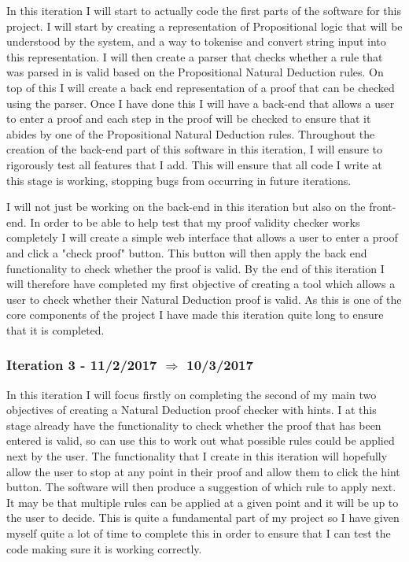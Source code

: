 In this iteration I will start to actually code the first parts of the software for this project. I will start by creating a representation of Propositional logic that will be understood by the system, and a way to tokenise and convert string input into this representation. I will then create a parser that checks whether a rule that was parsed in is valid based on the Propositional Natural Deduction rules. On top of this I will create a back end representation of a proof that can be checked using the parser. Once I have done this I will have a back-end that allows a user to enter a proof and each step in the proof will be checked to ensure that it abides by one of the Propositional Natural Deduction rules. Throughout the creation of the back-end part of this software in this iteration, I will ensure to rigorously test all features that I add. This will ensure that all code I write at this stage is working, stopping bugs from occurring in future iterations. 

I will not just be working on the back-end in this iteration but also on the front-end. In order to be able to help test that my proof validity checker works completely I will create a simple web interface that allows a user to enter a proof and click a "check proof" button. This button will then apply the back end functionality to check whether the proof is valid. By the end of this iteration I will therefore have completed my first objective of creating a tool which allows a user to check whether their Natural Deduction proof is valid. As this is one of the core components of the project I have made this iteration quite long to ensure that it is completed.

\subsubsection{Iteration 3 - 11/2/2017 $\Rightarrow$ 10/3/2017}

In this iteration I will focus firstly on completing the second of my main two objectives of creating a Natural Deduction proof checker with hints. I at this stage already have the functionality to check whether the proof that has been entered is valid, so can use this to work out what possible rules could be applied next by the user. The functionality that I create in this iteration will hopefully allow the user to stop at any point in their proof and allow them to click the hint button. The software will then produce a suggestion of which rule to apply next. It may be that multiple rules can be applied at a given point and it will be up to the user to decide. This is quite a fundamental part of my project so I have given myself quite a lot of time to complete this in order to ensure that I can test the code making sure it is working correctly.

